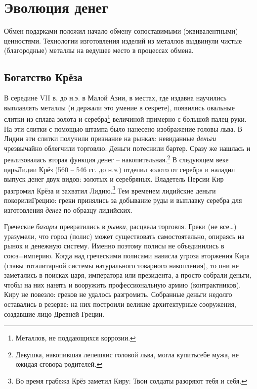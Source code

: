 %
%
\section[Эволюция денег ]{Эволюция денег }

Обмен подарками положил начало обмену сопоставимыми (эквивалентными) ценностями. Технологии изготовления изделий из
металлов выдвинули чистые (благородные) металлы на ведущее место в процессах обмена.

\subsection[Богатство Крёза]{Богатство Крёза}

В середине \foreignlanguage{english}{VII} в. до н.э. в Малой Азии, в местах, где издавна научились выплавлять металлы (и
держали это умение в секрете), появились овальные слитки из сплава золота и серебра\footnote{Металлов,
не поддающихся коррозии.} величиной примерно с большой палец руки. На эти слитки с помощью штампа было нанесено
изображение головы льва. В Лидии эти слитки получили признание на рынках: невиданные \textit{деньги} чрезвычайно
облегчили торговлю. Деньги потеснили бартер. Сразу же нашлась и реализовалась вторая функция денег –
накопительная.\footnote{Девушка, накопившая \flqq лепешки\frqq с головой льва, могла
{\textquotedbl}купить\frqq себе мужа, не ожидая сговора родителей.} В следующем веке
{\textquotedbl}царь\frqq Лидии Крёз (560 – 546 гг. до н.э.) отделил золото от серебра и наладил выпуск денег
двух видов: золотых и серебряных. Владетель Персии Кир разгромил Крёза и захватил Лидию.\footnote{Во
время грабежа Крёз заметил Киру: \flqq Твои солдаты разоряют тебя и себя\frqq.} Тем временем
лидийские деньги \flqq покорили\frqq Грецию: греки принялись за добывание руды и выплавку серебра
для изготовления \textit{денег} по образцу лидийских.


Греческие \textit{базары} превратились в \textit{рынки}, расцвела торговля. Греки (не все…) уразумели, что город
(\flqq полис\frqq) может существовать самостоятельно, опираясь на рынок и денежную систему. Именно
поэтому полисы не объединились в союз=империю. Когда над греческими полисами нависла угроза вторжения Кира (главы
тоталитарной системы натурального товарного накопления), то они не заметались в поисках царя, императора или
президента, а просто собрали деньги, чтобы на них нанять и вооружить профессиональную армию
(\flqq контрактников\frqq). Киру не повезло: греков не удалось разгромить. Собранные деньги недолго
оставались \flqq в резерве\frqq: на них построили великие архитектурные сооружения, создавшие лицо
Древней Греции.


